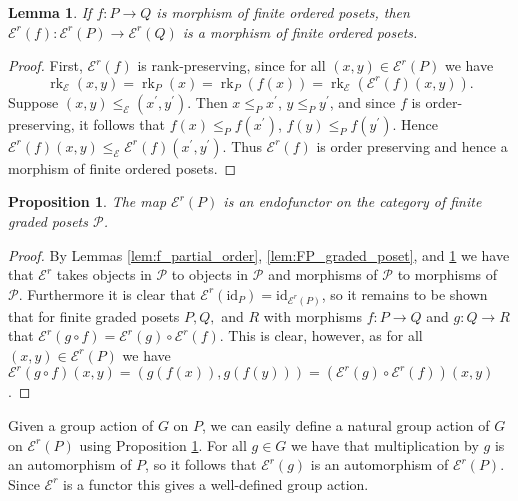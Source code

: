 \documentclass[10 pt]{amsart}
\theoremstyle{plain}
\newtheorem{prop}[thm]{Proposition}
\newtheorem{lem}[thm]{Lemma}
\theoremstyle{definition}
\theoremstyle{remark}
\numberwithin{equation}{section}
\newcommand\rk{\operatorname{rk}}
\newcommand{\id}{\mathrm{id}}
\begin{document}
\begin{lem}\label{lem:Ff_poset_morphism}
If $f\colon P\rightarrow Q$ is morphism of finite ordered posets, then $\mathcal E^r(f)\colon \mathcal E^r(P)\rightarrow \mathcal E^r(Q)$ is a morphism of finite ordered posets.
\end{lem}

\begin{proof}
First, $\mathcal E^r(f)$ is rank-preserving, since for all $(x, y)\in \mathcal E^r(P)$ we have 
$$\rk_{\mathcal E}(x, y) = \rk_P(x) = \rk_P(f(x)) = \rk_{\mathcal E}(\mathcal E^r(f)(x, y)).$$
Suppose $(x, y)\le_{\mathcal E} (x^\prime, y^\prime)$.  Then $x\le_P x^\prime$, $y\le_P y^\prime$, and since $f$ is order-preserving, it follows that $f(x)\le_P f(x^\prime)$, $f(y)\le_P f(y^\prime)$. Hence $\mathcal E^r(f)(x,y) \le_{\mathcal E} \mathcal E^r(f)(x^\prime , y^\prime)$.  Thus $\mathcal E^r(f)$ is order preserving and hence a morphism of finite ordered posets.
\end{proof}

\begin{prop}\label{prop:F_well_defined}
The map $\mathcal E^r(P)$ is an endofunctor on the category of finite graded posets $\mathcal{P}$.
\end{prop}

\begin{proof}
By Lemmas \ref{lem:f_partial_order}, \ref{lem:FP_graded_poset}, and \ref{lem:Ff_poset_morphism} we have that $\mathcal E^r$ takes objects in $\mathcal{P}$ to objects in $\mathcal{P}$ and morphisms of $\mathcal{P}$ to morphisms of $\mathcal{P}$.  Furthermore it is clear that $\mathcal E^r(\id_P) = \id_{\mathcal E^r(P)}$, so it remains to be shown that for finite graded posets $P, Q,$ and $R$ with morphisms $f\colon P\rightarrow Q$ and $g\colon Q\rightarrow R$ that $\mathcal E^r(g\circ f) = \mathcal E^r(g)\circ\mathcal E^r(f)$.  This is clear, however, as for all $(x, y)\in \mathcal E^r(P)$ we have $\mathcal E^r(g\circ f)(x, y) = (g(f(x)), g(f(y))) = \left(\mathcal E^r(g)\circ\mathcal E^r(f)\right)(x, y)$.
\end{proof}



Given a group action of $G$ on $P$, we can easily define a natural group action of $G$ on $\mathcal E^r(P)$ using Proposition \ref{prop:F_well_defined}.  For all $g\in G$ we have that multiplication by $g$ is an automorphism of $P$, so it follows that $\mathcal E^r(g)$ is an automorphism of $\mathcal E^r(P)$.  Since $\mathcal E^r$ is a functor this gives a well-defined group action.
\end{document}
